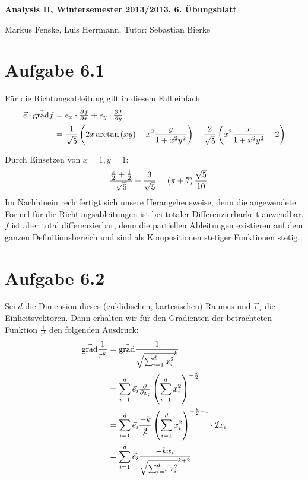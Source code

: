 \documentclass[a4paper,german,12pt,smallheadings]{scrartcl}
\begin{document}
\begin{center}
\bfseries %
\sffamily %
\vspace{-40pt}
Analysis II, Wintersemester 2013/2013, 6. Übungsblatt

Markus Fenske, Luis Herrmann, Tutor: Sebastian Bierke
\vspace{-10pt}
\end{center}
\allowdisplaybreaks %
\section*{Aufgabe 6.1}
Für die Richtungsableitung gilt in diesem Fall einfach
\begin{align*}
  \vec{e} \cdot \vec{\operatorname{grad}} f &= e_x \cdot \pd{f}{x} + e_y \cdot \pd{f}{y} \\
                                            &= \frac{1}{\sqrt{5}} \del{2x \arctan\del{xy} + x^2 \frac{y}{1+x^2y^2}}
                                               - \frac{2}{\sqrt{5}} \del{x^2 \frac{x}{1+x^2y^2} - 2}
\end{align*}

Durch Einsetzen von $x=1, y=1$:
\begin{equation*}
  = \frac{\frac{\pi}{2} + \frac{1}{2}}{\sqrt{5}} + \frac{3}{\sqrt{5}} = \del{\pi+7}\frac{\sqrt{5}}{10}
\end{equation*}
Im Nachhinein rechtfertigt sich unsere Herangehensweise, denn die angewendete Formel für die Richtungsableitungen ist bei totaler Differenzierbarkeit anwendbar. $f$ ist aber total differenzierbar, denn die partiellen Ableitungen existieren auf dem ganzen Definitionsbereich und sind als Kompositionen stetiger Funktionen stetig.

\section*{Aufgabe 6.2}
Sei $d$ die Dimension dieses (euklidischen, kartesischen) Raumes und $\vec{e}_i$ die Einheitsvektoren. Dann erhalten wir für den Gradienten der betrachteten Funktion $\frac{1}{r^k}$ den folgenden Ausdruck:
\begin{align*}
  \vec{\operatorname{grad}} \frac{1}{r^k} &= \vec{\operatorname{grad}} \frac{1}{\sqrt{\sum_{i=1}^d x_i^2}^k} \\
                                          &= \sum_{i=1}^d \vec{e}_i \pd{}{x_i} \del{\sum_{i=1}^d x_i^2}^{-\frac{k}{2}} \\
                                          &= \sum_{i=1}^d \vec{e}_i \frac{-k}{\cancel{2}} \del{\sum_{i=1}^d x_i^2}^{-\frac{k}{2}-1} \cdot \cancel{2} x_i \\
                                          &= \sum_{i=1}^d \vec{e}_i \frac{-kx_i}{\sqrt{\sum_{i=1}^d x_i^2}^{k+2}}
\end{align*}
\end{document}
